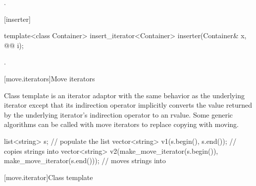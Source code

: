 \begin{itemdescr}
\pnum
\returns
{}.
\end{itemdescr}

[inserter]{}

%
\begin{itemdecl}
template<class Container>
  insert_iterator<Container> inserter(Container& x, @@ i);
\end{itemdecl}

\begin{itemdescr}
\pnum
\returns
{}.
\end{itemdescr}








[move.iterators]{Move iterators}

\pnum
Class template  is an iterator adaptor
with the same behavior as the underlying iterator except that its
indirection operator implicitly converts the value returned by the
underlying iterator's indirection operator to an rvalue.
Some generic algorithms can be called with move iterators to replace
copying with moving.

\pnum
\begin{example}

\begin{codeblock}
list<string> s;
// populate the list 
vector<string> v1(s.begin(), s.end());          // copies strings into 
vector<string> v2(make_move_iterator(s.begin()),
                  make_move_iterator(s.end())); // moves strings into 
\end{codeblock}

\end{example}

[move.iterator]{Class template }

